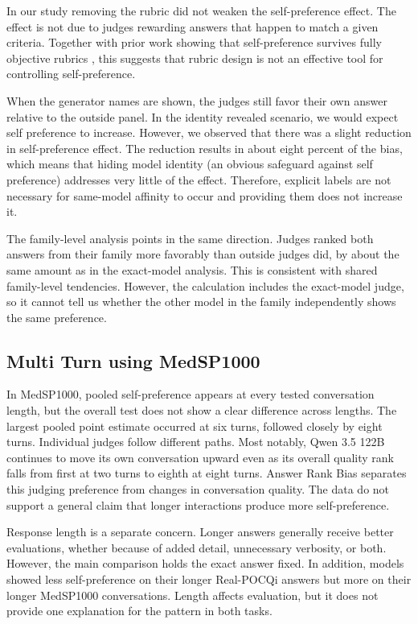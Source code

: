 \documentclass[11pt]{article}
\begin{document}
In our study removing the rubric did not weaken the self-preference effect. The effect is not due to judges rewarding answers that happen to match a given criteria. Together with prior work showing that self-preference survives fully objective rubrics \citep{pombal2026selfpreference}, this suggests that rubric design is not an effective tool for controlling self-preference.

When the generator names are shown, the judges still favor their own answer relative to the outside panel. In the identity revealed scenario, we would expect self preference to increase. However, we observed that there was a slight reduction in self-preference effect. The reduction results in about eight percent of the bias, which means that hiding model identity (an obvious safeguard against self preference) addresses very little of the effect. Therefore, explicit labels are not necessary for same-model affinity to occur and providing them does not increase it.

The family-level analysis points in the same direction. Judges ranked both answers from their family more favorably than outside judges did, by about the same amount as in the exact-model analysis. This is consistent with shared family-level tendencies. However, the calculation includes the exact-model judge, so it cannot tell us whether the other model in the family independently shows the same preference.

\subsection{Multi Turn using MedSP1000}


In MedSP1000, pooled self-preference appears at every tested conversation length, but the overall test does not show a clear difference across lengths. The largest pooled point estimate occurred at six turns, followed closely by eight turns. Individual judges follow different paths. Most notably, Qwen 3.5 122B continues to move its own conversation upward even as its overall quality rank falls from first at two turns to eighth at eight turns. Answer Rank Bias separates this judging preference from changes in conversation quality. The data do not support a general claim that longer interactions produce more self-preference.

\bigskip

Response length is a separate concern. Longer answers generally receive better evaluations, whether because of added detail, unnecessary verbosity, or both. However, the main comparison holds the exact answer fixed. In addition, models showed less self-preference on their longer Real-POCQi answers but more on their longer MedSP1000 conversations. Length affects evaluation, but it does not provide one explanation for the pattern in both tasks.
\end{document}
